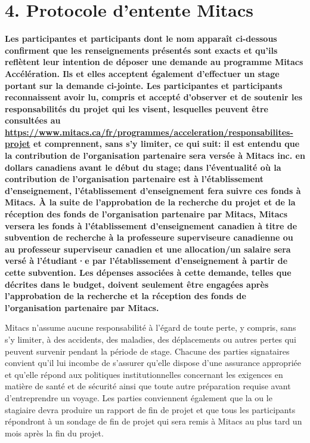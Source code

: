 \newcommand{\addul}[1]{\underline{#1}}
\titleformat{\section}{\centering\Large\bfseries}{\thesection}{1em}{\addul}
\section*{4. Protocole d'entente Mitacs}

{
\bfseries
Les participantes et participants dont le nom apparaît ci-dessous confirment que les renseignements présentés sont exacts et qu'ils reflètent leur intention de déposer une demande au programme Mitacs Accélération. Ils et elles acceptent également d'effectuer un stage portant sur la demande ci-jointe. Les participantes et participants reconnaissent avoir lu, compris et accepté d'observer et de soutenir les responsabilités du projet qui les visent, lesquelles peuvent être consultées au \url{https://www.mitacs.ca/fr/programmes/acceleration/responsabilites-projet} et comprennent, sans s'y limiter, ce qui suit: il est entendu que la contribution de l'organisation partenaire sera versée à Mitacs inc. en dollars canadiens avant le début du stage; dans l'éventualité où la contribution de l'organisation partenaire est à l'établissement d'enseignement, l'établissement d'enseignement fera suivre ces fonds à Mitacs. À la suite de l'approbation de la recherche du projet et de la réception des fonds de l'organisation partenaire par Mitacs, Mitacs versera les fonds à l'établissement d'enseignement canadien à titre de subvention de recherche à la professeure superviseure canadienne ou au professeur superviseur canadien et une allocation/un salaire sera versé à l'étudiant·e par l'établissement d'enseignement à partir de cette subvention. Les dépenses associées à cette demande, telles que décrites dans le budget, doivent seulement être engagées après l'approbation de la recherche et la réception des fonds de l'organisation partenaire par Mitacs.

\noindent
Mitacs n'assume aucune responsabilité à l'égard de toute perte, y compris, sans s'y limiter, à des accidents, des maladies, des déplacements ou autres pertes qui peuvent survenir pendant la période de stage. Chacune des parties signataires convient qu'il lui incombe de s'assurer qu'elle dispose d'une assurance appropriée et qu'elle répond aux politiques institutionnelles concernant les exigences en matière de santé et de sécurité ainsi que toute autre préparation requise avant d'entreprendre un voyage. Les parties conviennent également que la ou le stagiaire devra produire un rapport de fin de projet et que tous les participants répondront à un sondage de fin de projet qui sera remis à Mitacs au plus tard un mois après la fin du projet.

}
